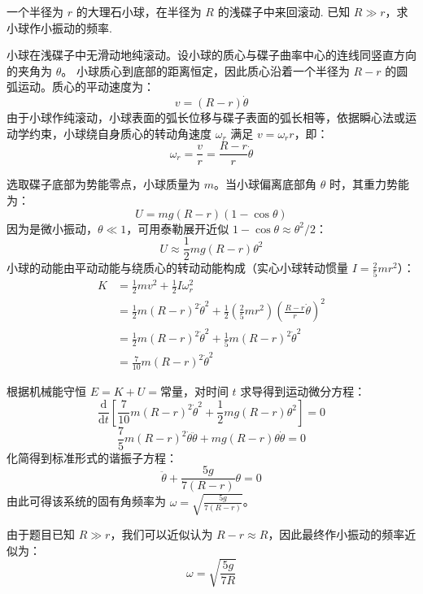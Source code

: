 \begin{exercise}\label{ex:7.3}
一个半径为 $r$ 的大理石小球，在半径为 $R$ 的浅碟子中来回滚动. 已知 $R \gg r$，求小球作小振动的频率.
\end{exercise}
\begin{solution}
小球在浅碟子中无滑动地纯滚动。设小球的质心与碟子曲率中心的连线同竖直方向的夹角为 $\theta$。
小球质心到底部的距离恒定，因此质心沿着一个半径为 $R - r$ 的圆弧运动。质心的平动速度为：
$$ v = (R - r) \dot{\theta} $$
由于小球作纯滚动，小球表面的弧长位移与碟子表面的弧长相等，依据瞬心法或运动学约束，小球绕自身质心的转动角速度 $\omega_r$ 满足 $v = \omega_r r$，即：
$$ \omega_r = \frac{v}{r} = \frac{R - r}{r} \dot{\theta} $$

选取碟子底部为势能零点，小球质量为 $m$。当小球偏离底部角 $\theta$ 时，其重力势能为：
$$ U = m g (R - r) (1 - \cos\theta) $$
因为是微小振动，$\theta \ll 1$，可用泰勒展开近似 $1 - \cos\theta \approx \theta^2 / 2$：
$$ U \approx \frac{1}{2} m g (R - r) \theta^2 $$
小球的动能由平动动能与绕质心的转动动能构成（实心小球转动惯量 $I = \frac{2}{5} m r^2$）：
\begin{align*}
    K &= \frac{1}{2} m v^2 + \frac{1}{2} I \omega_r^2 \\
      &= \frac{1}{2} m (R - r)^2 \dot{\theta}^2 + \frac{1}{2} \left( \frac{2}{5} m r^2 \right) \left( \frac{R - r}{r} \dot{\theta} \right)^2 \\
      &= \frac{1}{2} m (R - r)^2 \dot{\theta}^2 + \frac{1}{5} m (R - r)^2 \dot{\theta}^2 \\
      &= \frac{7}{10} m (R - r)^2 \dot{\theta}^2
\end{align*}

根据机械能守恒 $E = K + U = \text{常量}$，对时间 $t$ 求导得到运动微分方程：
$$ \frac{\mathrm{d}}{\mathrm{d}t} \left[ \frac{7}{10} m (R - r)^2 \dot{\theta}^2 + \frac{1}{2} m g (R - r) \theta^2 \right] = 0 $$
$$ \frac{7}{5} m (R - r)^2 \dot{\theta} \ddot{\theta} + m g (R - r) \theta \dot{\theta} = 0 $$
化简得到标准形式的谐振子方程：
$$ \ddot{\theta} + \frac{5g}{7(R - r)} \theta = 0 $$
由此可得该系统的固有角频率为 $\omega = \sqrt{\frac{5g}{7(R - r)}}$。

由于题目已知 $R \gg r$，我们可以近似认为 $R - r \approx R$，因此最终作小振动的频率近似为：
$$ \omega = \sqrt{\frac{5g}{7R}} $$
\end{solution}

